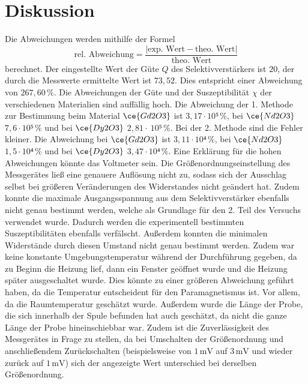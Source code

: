 %

\section{Diskussion}
\label{sec:Diskussion}
Die Abweichungen werden mithilfe der Formel
\begin{equation*}
    \text{rel. Abweichung} = \frac{|\text{exp. Wert} - \text{theo. Wert}|}{\text{theo. Wert}}
  \end{equation*}
berechnet. Der eingestellte Wert der Güte $Q$ des Selektivverstärkers ist $20$, der durch die Messwerte ermittelte Wert ist $73,52$. Dies entspricht einer Abweichung
von $267,60\,\%$.
Die Abweichungen der Güte und der Suszeptibilität $\chi$ der verschiedenen Materialien sind auffällig hoch. Die Abweichung der 1. Methode zur Bestimmung beim Material $\ce{Gd2O3}$ ist 
$3,17 \cdot 10⁵ \, \%$, bei $\ce{Nd2O3}$ $7,6 \cdot 10⁵ \, \%$ und bei $\ce{Dy2O3}$ $2,81 \cdot \ 10⁵ \, \%$. Bei der 2. Methode sind die Fehler kleiner. Die Abweichung bei
$\ce{Gd2O3}$ ist $3,11 \cdot 10⁴ \, \%$, bei $\ce{Nd2O3}$ $1,5 \cdot 10⁴ \, \%$ und bei $\ce{Dy2O3}$ $3,47 \cdot 10⁴ \, \%$.
Eine Erklärung für die hohen Abweichungen könnte das Voltmeter sein. Die Größenordnungseinstellung des Messgerätes ließ eine genauere Auflösung nicht zu, sodass sich
der Ausschlag selbst bei größeren Veränderungen des Widerstandes nicht geändert hat. Zudem konnte die maximale Ausgangsspannung aus dem Selektivverstärker 
ebenfalls nicht genau bestimmt werden, welche als Grundlage für den 2. Teil des Versuchs verwendet wurde. Dadurch werden die experimentell bestimmten Suszeptibilitäten 
ebenfalls verfälscht. 
Außerdem konnten die minimalen Widerstände durch diesen Umstand nicht genau bestimmt werden. Zudem war keine konstante Umgebungstemperatur während der Durchführung 
gegeben, da zu Beginn die Heizung lief, dann ein Fenster geöffnet wurde und die Heizung später ausgeschaltet wurde. Dies könnte zu einer größeren Abweichung geführt 
haben, da die Temperatur entscheident für den Paramagnetismus ist. Vor allem, da die Raumtemperatur geschätzt wurde.
Außerdem wurde die Länge der Probe, die sich innerhalb der Spule befunden hat auch geschätzt, da nicht die ganze Länge der Probe hineinschiebbar war. Zudem ist die 
Zuverlässigkeit des Messgerätes in Frage zu stellen, da bei Umschalten der Größenordnung und anschließendem Zurückschalten (beispielsweise von 
$1 \, \unit{\milli\volt}$ auf $3 \, \unit{\milli\volt}$ und wieder zurück auf $1 \, \unit{\milli\volt}$) sich der angezeigte Wert 
unterschied bei derselben Größenordnung. 
